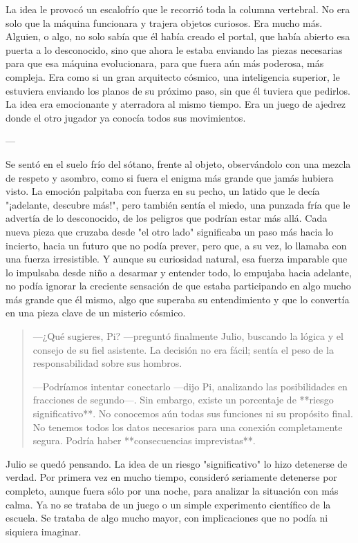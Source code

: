 \documentclass[a4paper,12pt]{book}
\begin{document}
La idea le provocó un escalofrío que le recorrió toda la columna vertebral. No era solo que la máquina funcionara y trajera objetos curiosos. Era mucho más. Alguien, o algo, no solo sabía que él había creado el portal, que había abierto esa puerta a lo desconocido, sino que ahora le estaba enviando las piezas necesarias para que esa máquina evolucionara, para que fuera aún más poderosa, más compleja. Era como si un gran arquitecto cósmico, una inteligencia superior, le estuviera enviando los planos de su próximo paso, sin que él tuviera que pedirlos. La idea era emocionante y aterradora al mismo tiempo. Era un juego de ajedrez donde el otro jugador ya conocía todos sus movimientos.

---

Se sentó en el suelo frío del sótano, frente al objeto, observándolo con una mezcla de respeto y asombro, como si fuera el enigma más grande que jamás hubiera visto. La emoción palpitaba con fuerza en su pecho, un latido que le decía "¡adelante, descubre más!", pero también sentía el miedo, una punzada fría que le advertía de lo desconocido, de los peligros que podrían estar más allá. Cada nueva pieza que cruzaba desde "el otro lado" significaba un paso más hacia lo incierto, hacia un futuro que no podía prever, pero que, a su vez, lo llamaba con una fuerza irresistible. Y aunque su curiosidad natural, esa fuerza imparable que lo impulsaba desde niño a desarmar y entender todo, lo empujaba hacia adelante, no podía ignorar la creciente sensación de que estaba participando en algo mucho más grande que él mismo, algo que superaba su entendimiento y que lo convertía en una pieza clave de un misterio cósmico.

\begin{quote}
    —¿Qué sugieres, Pi? —preguntó finalmente Julio, buscando la lógica y el consejo de su fiel asistente. La decisión no era fácil; sentía el peso de la responsabilidad sobre sus hombros.

    —Podríamos intentar conectarlo —dijo Pi, analizando las posibilidades en fracciones de segundo—. Sin embargo, existe un porcentaje de **riesgo significativo**. No conocemos aún todas sus funciones ni su propósito final. No tenemos todos los datos necesarios para una conexión completamente segura. Podría haber **consecuencias imprevistas**.
\end{quote}

Julio se quedó pensando. La idea de un riesgo "significativo" lo hizo detenerse de verdad. Por primera vez en mucho tiempo, consideró seriamente detenerse por completo, aunque fuera sólo por una noche, para analizar la situación con más calma. Ya no se trataba de un juego o un simple experimento científico de la escuela. Se trataba de algo mucho mayor, con implicaciones que no podía ni siquiera imaginar.
\end{document}
